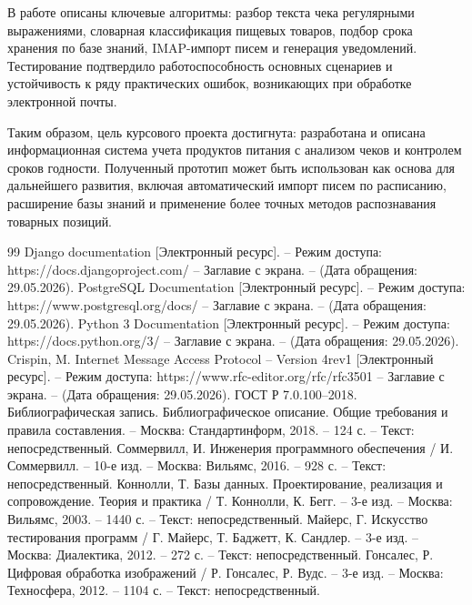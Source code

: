 \documentclass[14pt,a4paper]{extreport}
\begin{document}
В работе описаны ключевые алгоритмы: разбор текста чека регулярными выражениями, словарная классификация пищевых товаров, подбор срока хранения по базе знаний, IMAP-импорт писем и генерация уведомлений. Тестирование подтвердило работоспособность основных сценариев и устойчивость к ряду практических ошибок, возникающих при обработке электронной почты.

Таким образом, цель курсового проекта достигнута: разработана и описана информационная система учета продуктов питания с анализом чеков и контролем сроков годности. Полученный прототип может быть использован как основа для дальнейшего развития, включая автоматический импорт писем по расписанию, расширение базы знаний и применение более точных методов распознавания товарных позиций.

\newpage
\renewcommand\bibname{\centering Библиографический список}
\clearpage
{}
\begin{thebibliography}{99}
 Django documentation [Электронный ресурс]. -- Режим доступа: https://docs.djangoproject.com/ -- Заглавие с экрана. -- (Дата обращения: 29.05.2026).
 PostgreSQL Documentation [Электронный ресурс]. -- Режим доступа: https://www.postgresql.org/docs/ -- Заглавие с экрана. -- (Дата обращения: 29.05.2026).
 Python 3 Documentation [Электронный ресурс]. -- Режим доступа: https://docs.python.org/3/ -- Заглавие с экрана. -- (Дата обращения: 29.05.2026).
 Crispin, M. Internet Message Access Protocol -- Version 4rev1 [Электронный ресурс]. -- Режим доступа: https://www.rfc-editor.org/rfc/rfc3501 -- Заглавие с экрана. -- (Дата обращения: 29.05.2026).
 ГОСТ Р 7.0.100--2018. Библиографическая запись. Библиографическое описание. Общие требования и правила составления. -- Москва: Стандартинформ, 2018. -- 124 с. -- Текст: непосредственный.
 Соммервилл, И. Инженерия программного обеспечения / И. Соммервилл. -- 10-е изд. -- Москва: Вильямс, 2016. -- 928 с. -- Текст: непосредственный.
 Коннолли, Т. Базы данных. Проектирование, реализация и сопровождение. Теория и практика / Т. Коннолли, К. Бегг. -- 3-е изд. -- Москва: Вильямс, 2003. -- 1440 с. -- Текст: непосредственный.
 Майерс, Г. Искусство тестирования программ / Г. Майерс, Т. Баджетт, К. Сандлер. -- 3-е изд. -- Москва: Диалектика, 2012. -- 272 с. -- Текст: непосредственный.
 Гонсалес, Р. Цифровая обработка изображений / Р. Гонсалес, Р. Вудс. -- 3-е изд. -- Москва: Техносфера, 2012. -- 1104 с. -- Текст: непосредственный.
\end{thebibliography}
\end{document}
